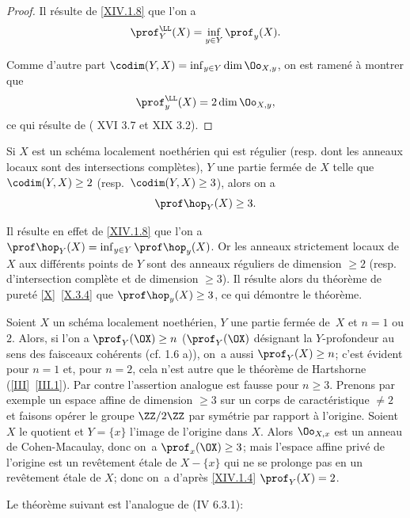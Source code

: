 \begin{proof}
Il r\'esulte de \ref{XIV.1.8} que l'on a
$$
\prof_Y^{\LL}(X)=\inf_{y\in Y} \prof_y(X).
$$

Comme d'autre part $\codim(Y, X)=\inf_{y\in Y} \dim \Oo_{X, y}$, on est ramen\'e \`a montrer que
$$
\prof_y^{\LL}(X)=2 \dim \Oo_{X, y},
$$
ce qui r\'esulte de ( XVI 3.7 et XIX 3.2).
\skipqed
\end{proof}

\begin{theoreme} \label{XIV.1.11}
Si $X$ est un sch\'ema localement noeth\'erien qui est r\'egulier (resp. dont les anneaux locaux sont des intersections compl\`etes), $Y$ une partie ferm\'ee de $X$ telle que $\codim(Y, X)\geq 2$ (resp.\ \hbox{$\codim(Y, X)\geq3$}), alors on a
$$
\prof \hop_Y(X)\geq 3.
$$
\end{theoreme}

Il r\'esulte en effet de \ref{XIV.1.8} que l'on a $\prof \hop_Y(X)=\inf_{y\in Y} \prof \hop_y(X)$. Or les anneaux strictement locaux de $X$ aux diff\'erents points de $Y$ sont des anneaux r\'eguliers de dimension $\geq 2$ (resp. d'intersection compl\`ete et de dimension $\geq 3$). Il r\'esulte alors du th\'eor\`eme de puret\'e \ref{X}~\ref{X.3.4} que $\prof \hop_y(X)\geq 3$, ce qui d\'emontre le th\'eor\`eme.

\begin{exemple} \label{XIV.1.12}
Soient $X$ un sch\'ema localement noeth\'erien, $Y$ une partie ferm\'ee de~$X$ et $n=1$ ou $2$. Alors, si l'on a $\prof_Y(\OX)\geq n$ ($\prof_Y(\OX)$ d\'esignant la $Y$-profondeur au sens des faisceaux coh\'erents (cf. 1.6 a)), on~a aussi $\prof_Y(X)\geq n$; c'est \'evident pour $n=1$ et, pour $n=2$, cela n'est autre que le th\'eor\`eme de Hartshorne (\ref{III}~\ref{III.1}). Par contre l'assertion analogue est fausse pour $n\geq 3$. Prenons par exemple un espace affine de dimension $\geq 3$ sur un corps de caract\'eristique $\neq 2$ et faisons op\'erer le groupe $\ZZ/2\ZZ$ par sym\'etrie par rapport \`a l'origine. Soient $X$ le quotient et $Y=\{x\}$ l'image de l'origine dans $X$. Alors $\Oo_{X, x}$ est un anneau de Cohen-Macaulay, donc on~a $\prof_x(\OX)\geq 3$; mais l'espace affine priv\'e de l'origine est un rev\^etement \'etale de $X-\{x\}$ qui ne se prolonge pas en un rev\^etement \'etale de $X$; donc on~a d'apr\`es \ref{XIV.1.4} $\prof_Y(X)=2$.
\end{exemple}

Le th\'eor\`eme suivant est l'analogue de (\EGA IV 6.3.1):

